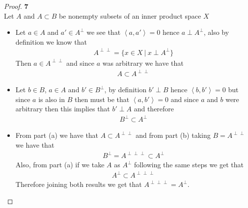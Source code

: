 \documentclass[11pt]{article}
\newcommand{\inprd}[1]{\left\langle{#1}\right\rangle}
\theoremstyle{definition}
\begin{document}
\cleardoublepage
\begin{proof}{\textbf{7}}\\
Let $A$ and $A \subset  B$ be nonempty subsets of an inner product space $X$
\begin{itemize}
\item [(a)] Let $a \in A$ and $a' \in A^\perp$ we see that $\inprd{a,a'} = 0$
hence $a \perp A^\perp$, also by definition we know that
\begin{align*}
    A^{\perp\perp} = \{x \in X ~|~ x \perp A^{\perp}\}
\end{align*}
Then $a \in A^{\perp\perp}$ and since $a$ was arbitrary we have that
\begin{align*}
    A \subset A^{\perp\perp}
\end{align*}
\item [(b)] Let $b \in B$, $a \in A$ and $b' \in B^\perp$, by definition
$b' \perp B$ hence $\inprd{b, b'} = 0$ but since $a$ is also in $B$ then
must be that $\inprd{a, b'} = 0$ and since $a$ and $b$ were arbitrary then
this implies that $b' \perp A$ and therefore
\begin{align*}
    B^{\perp} \subset A^\perp
\end{align*}
\item [(c)] From part (a) we have that $A \subset A^{\perp\perp}$ and from part
(b) taking $B = A^{\perp\perp}$ we have that
\begin{align*}
    B^{\perp} = A^{\perp\perp\perp} \subset A^\perp
\end{align*}
Also, from part (a) if we take $A$ as $A^\perp$ following the same steps we get
that
\begin{align*}
    A^\perp \subset A^{\perp\perp\perp}
\end{align*}
Therefore joining both results we get that $A^{\perp\perp\perp} = A^\perp$.
\end{itemize}
\end{proof}
\end{document}
